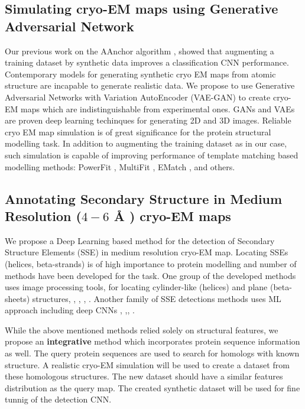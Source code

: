 \subsection{Simulating cryo-EM maps using Generative Adversarial Network}
Our previous work on the AAnchor algorithm \cite{Rozanov2018AAnchor:Maps}, showed that augmenting a training dataset by  synthetic data improves a classification CNN performance. 
Contemporary models for generating   synthetic cryo EM maps from atomic structure are incapable to generate realistic data.
We propose to use Generative Adversarial Networks  with Variation AutoEncoder (VAE-GAN) to create cryo-EM maps which are indistinguishable from experimental ones.
GANs  and VAEs are proven deep learning techinques for generating 2D and 3D images.
Reliable cryo EM map simulation is of great significance for the protein structural modelling task. 
In addition to augmenting the training dataset as in our case, such simulation is capable of improving performance of template matching based modelling methods: PowerFit \cite{C.P.vanZundert2015}, MultiFit \cite{Tjioe2011}, EMatch \cite{Dror2006}, and others. 



\subsection{Annotating Secondary Structure in Medium Resolution ($4 -6$ {{\AA} } ) cryo-EM maps}

We propose a Deep Learning based method for the detection  of Secondary Structure Elements (SSE) in medium resolution cryo-EM map.
Locating SSEs (helices, beta-strands) is of high importance to protein modelling and number of methods have been developed for the task.
One group of the developed  methods uses image  processing tools, for locating cylinder-like (helices) and plane (beta-sheets) structures, \cite{Baker2007a},  \cite{Jiang2001}, \cite{Rusu2012}, \cite{Yu2008}.
Another family of SSE detections methods uses ML approach \cite{Ma2012RENNSH:Maps} \cite{Si2012a} including  deep CNNs \cite{Velankar2012}, \cite{Li2016},\cite{Ma2003}, \cite{Mostosi2019AutomatedNetworks}.


While the above mentioned methods relied solely on structural features, we propose an \textbf{integrative} method  which 
incorporates protein sequence information as well.
The query protein sequences are used to search for homologs with known structure.
A realistic cryo-EM simulation will be used to create a dataset from these homologous structures.
The new dataset should have a similar features distribution as the query map.
The created synthetic dataset will be used for fine tunnig of the detection CNN.

